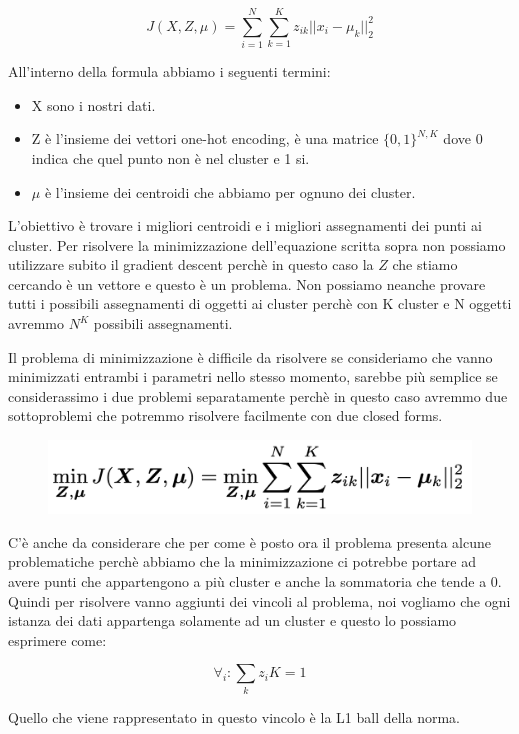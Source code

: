 \documentclass[14pt]{extreport}
\begin{document}
$$J(X,Z,\mu) = \sum_{i=1}^N \sum_{k=1}^K z_{ik}||x_i - \mu_k||_2^2$$

All'interno della formula abbiamo i seguenti termini:
\begin{itemize}
	\item X sono i nostri dati.
	\item Z è l'insieme dei vettori one-hot encoding, è una matrice $\{0,1\}^{N,K}$ dove 0 indica che quel punto non è nel cluster e 1 si.
	\item $\mu$ è l'insieme dei centroidi che abbiamo per ognuno dei cluster.
\end{itemize}

L'obiettivo è trovare i migliori centroidi e i migliori assegnamenti dei punti ai cluster. Per risolvere la minimizzazione dell'equazione scritta
sopra non possiamo utilizzare subito il gradient descent perchè in questo caso la $Z$ che stiamo cercando è un vettore e questo è un problema. Non
possiamo neanche provare tutti i possibili assegnamenti di oggetti ai cluster perchè con K cluster e N oggetti avremmo $N^K$ possibili assegnamenti.

Il problema di minimizzazione è difficile da risolvere se consideriamo che vanno minimizzati entrambi i parametri nello stesso momento, sarebbe più
semplice se considerassimo i due problemi separatamente perchè in questo caso avremmo due sottoproblemi che potremmo risolvere facilmente con due
closed forms.

\begin{figure}[H]
	\centering
	\includegraphics[width=0.7\linewidth]{537.jpeg}
\end{figure}

C'è anche da considerare che per come è posto ora il problema presenta alcune problematiche perchè abbiamo che la minimizzazione ci potrebbe portare
ad avere punti che appartengono a più cluster e anche la sommatoria che tende a 0. Quindi per risolvere vanno aggiunti dei vincoli al problema, noi
vogliamo che ogni istanza dei dati appartenga solamente ad un cluster e questo lo possiamo esprimere come:

$$\forall_i : \sum_k z_i K = 1$$

Quello che viene rappresentato in questo vincolo è la L1 ball della norma.
\end{document}

